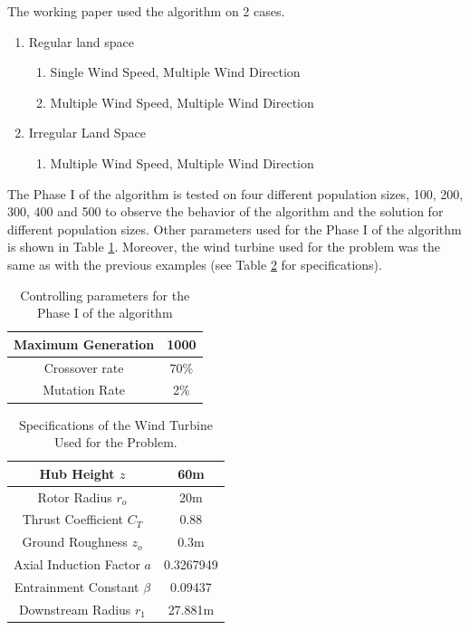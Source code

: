 The working paper used the algorithm on 2 cases.
\begin{enumerate}
    \item Regular land space
    \begin{enumerate}
        \item Single Wind Speed, Multiple Wind Direction
        \item Multiple Wind Speed, Multiple Wind Direction
    \end{enumerate}
    \item Irregular Land Space
    \begin{enumerate}
        \item Multiple Wind Speed, Multiple Wind Direction
    \end{enumerate}
\end{enumerate}

    The Phase I of the algorithm is tested on four different population sizes, 100, 200, 300, 400 and 500 to observe the behavior of the algorithm and the solution for different population sizes. Other parameters used for the Phase I of the algorithm is shown in Table \ref{paramPhaseI}. Moreover, the wind turbine used for the problem was the same as with the previous examples (see Table \ref{specsA} for specifications).
    
    \begin{table}[H]
        \centering
        \begin{tabular}{|c|c|} \hline
            Maximum Generation & 1000 \\ \hline
            Crossover rate & 70\% \\ \hline
            Mutation Rate & 2\% \\ \hline
        \end{tabular}
        \caption{Controlling parameters for the Phase I of the algorithm}
        \label{paramPhaseI}
    \end{table}
    
    \begin{table}[H]
        \centering
        \begin{tabular}{|c|c|} \hline
            Hub Height $z$ & 60m \\ \hline
            Rotor Radius $r_o$ & 20m \\ \hline
            Thrust Coefficient $C_T$ & 0.88 \\ \hline
            Ground Roughness $z_o$ & 0.3m \\ \hline
            Axial Induction Factor $a$ & 0.3267949 \\ \hline
            Entrainment Constant $\beta$ & 0.09437 \\ \hline
            Downstream Radius $r_1$ & 27.881m \\ \hline
        \end{tabular}
        \caption{Specifications of the Wind Turbine Used for the Problem.}
        \label{specsA}
    \end{table}
    
